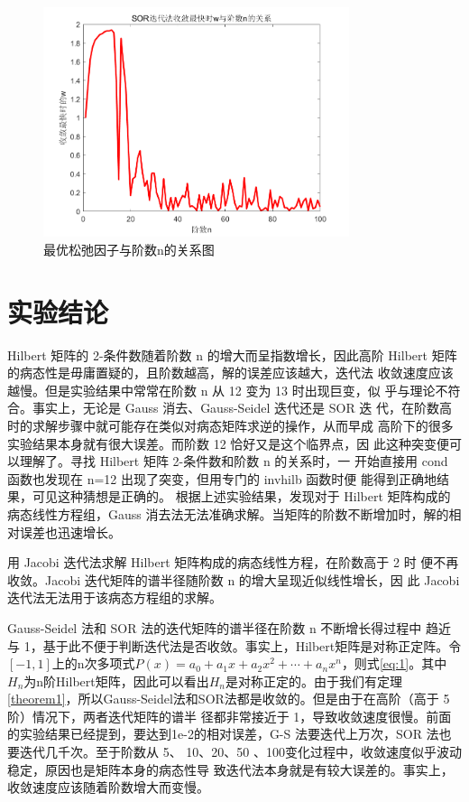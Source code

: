 \documentclass[a4paper]{article}
\begin{document}
\begin{figure}[!h]
	\centering
	\includegraphics[width=0.8\textwidth]{../code/result/bestw}
	\caption{\label{fig:12}最优松弛因子与阶数n的关系图}
\end{figure}

\section{实验结论}
Hilbert 矩阵的 2-条件数随着阶数 n 的增大而呈指数增长，因此高阶
Hilbert 矩阵的病态性是毋庸置疑的，且阶数越高，解的误差应该越大，迭代法
收敛速度应该越慢。但是实验结果中常常在阶数 n 从 12 变为 13 时出现巨变，似
乎与理论不符合。事实上，无论是 Gauss 消去、Gauss-Seidel 迭代还是 SOR 迭
代，在阶数高时的求解步骤中就可能存在类似对病态矩阵求逆的操作，从而早成
高阶下的很多实验结果本身就有很大误差。而阶数 12 恰好又是这个临界点，因
此这种突变便可以理解了。寻找 Hilbert 矩阵 2-条件数和阶数 n 的关系时，一
开始直接用 cond 函数也发现在 n=12 出现了突变，但用专门的 invhilb 函数时便
能得到正确地结果，可见这种猜想是正确的。 
根据上述实验结果，发现对于 Hilbert 矩阵构成的病态线性方程组，Gauss
消去法无法准确求解。当矩阵的阶数不断增加时，解的相对误差也迅速增长。

用 Jacobi 迭代法求解 Hilbert 矩阵构成的病态线性方程，在阶数高于 2 时
便不再收敛。Jacobi 迭代矩阵的谱半径随阶数 n 的增大呈现近似线性增长，因
此 Jacobi 迭代法无法用于该病态方程组的求解。 

Gauss-Seidel 法和 SOR 法的迭代矩阵的谱半径在阶数 n 不断增长得过程中
趋近与 1，基于此不便于判断迭代法是否收敛。事实上，Hilbert矩阵是对称正定阵。令$[-1,1]$上的n次多项式$P(x)=a_0+a_1x+a_2x^2+\cdots+a_nx^n$，则式\ref{eq:1}。其中$H_n$为n阶Hilbert矩阵，因此可以看出$H_n$是对称正定的。由于我们有定理\ref{theorem1}，所以Gauss-Seidel法和SOR法都是收敛的。但是由于在高阶（高于 5 阶）情况下，两者迭代矩阵的谱半
径都非常接近于 1，导致收敛速度很慢。前面的实验结果已经提到，要达到1e-2的相对误差，G-S 法要迭代上万次，SOR 法也要迭代几千次。至于阶数从 5、
10、20、50 、100变化过程中，收敛速度似乎波动稳定，原因也是矩阵本身的病态性导
致迭代法本身就是有较大误差的。事实上，收敛速度应该随着阶数增大而变慢。
\end{document}
